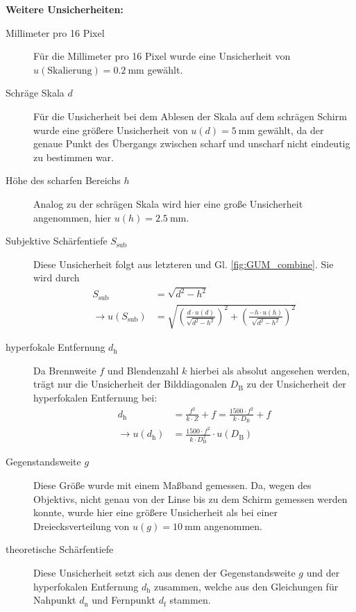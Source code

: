 	\vspace{1cm}	
	\begin{flushleft}
		\textbf{Weitere Unsicherheiten:}
	\end{flushleft}	
	\begin{description}
	
		\item[Millimeter pro 16 Pixel] Für die Millimeter pro 16 Pixel wurde eine Unsicherheit von $u(\text{Skalierung}) = \SI{0,2}{\milli\meter}$ gewählt.
		\item[Schräge Skala $d$] Für die Unsicherheit bei dem Ablesen der Skala auf dem schrägen Schirm wurde eine größere Unsicherheit von $ u(d) = \SI{5}{\milli\meter}$ gewählt, da der genaue Punkt des Übergangs zwischen scharf und unscharf nicht eindeutig zu bestimmen war.
		\item[Höhe des scharfen Bereichs $h$] Analog zu der schrägen Skala wird hier eine große Unsicherheit angenommen, hier $ u(h) = \SI{2,5}{\milli\meter}$.
		\item[Subjektive Schärfentiefe $S_\text{sub}$] Diese Unsicherheit folgt aus letzteren und Gl. \ref{fig:GUM_combine}.
		Sie wird durch 
		\begin{align}
			S_\text{sub} &= \sqrt{d^2-h^2} \\
			\rightarrow u(S_\text{sub}) &= \sqrt{\left( \frac{d\cdot u(d)}{\sqrt{d^2-h^2}}\right)^2 + \left( \frac{- h\cdot u(h)}{\sqrt{d^2-h^2}}\right)^2} 
		\end{align}
		\item[hyperfokale Entfernung $d_\text{h}$] Da Brennweite $f$ und Blendenzahl $k$ hierbei als absolut angesehen werden, trägt nur die Unsicherheit der Bilddiagonalen $D_\text{B}$ zu der Unsicherheit der hyperfokalen Entfernung bei:
		\begin{align}
			d_\text{h} &= \frac{f^2}{k\cdot Z} + f = \frac{1500\cdot f^2}{k\cdot D_\text{B}} + f \\
			\rightarrow u(d_\text{h}) &= \frac{1500\cdot f^2}{k\cdot D_\text{B}^2} \cdot u(D_\text{B})
		\end{align}	
		\item[Gegenstandsweite $g$] Diese Größe wurde mit einem Maßband gemessen. Da, wegen des Objektivs, nicht genau von der Linse bis zu dem Schirm gemessen werden konnte, wurde hier eine größere Unsicherheit als bei einer Dreiecksverteilung von $u(g) = \SI{10}{\milli\meter}$ angenommen.
		\item[theoretische Schärfentiefe] Diese Unsicherheit setzt sich aus denen der Gegenstandsweite $g$ und der hyperfokalen Entfernung $d_\text{h}$ zusammen, welche aus den Gleichungen für Nahpunkt $d_\text{n}$ und Fernpunkt $d_\text{f}$ stammen.

\end{description}
